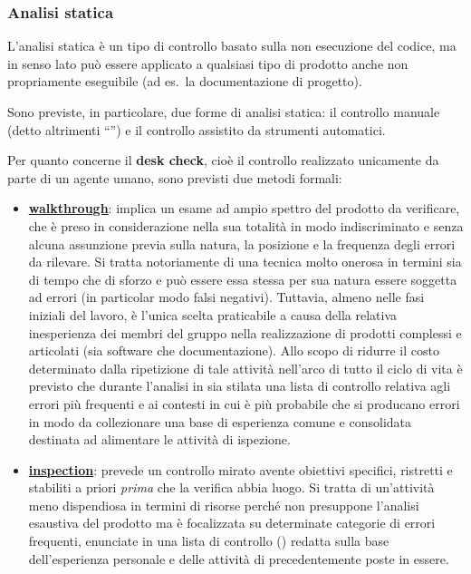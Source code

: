{\subsubsection{Analisi statica}
\label{analisi_statica}
L'analisi statica è un tipo di controllo basato sulla non esecuzione del codice, ma in senso lato può essere applicato a qualsiasi tipo di prodotto anche non propriamente eseguibile (ad es.~la documentazione di progetto).

Sono previste, in particolare, due forme di analisi statica: il controllo manuale (detto altrimenti ``'') e il controllo assistito da strumenti automatici.

Per quanto concerne il \textbf{desk check}, cioè il controllo realizzato unicamente da parte di un agente umano, sono previsti due metodi formali:
\begin{itemize}
  \item \textbf{\underline{walkthrough}}: implica un esame ad ampio spettro del prodotto da verificare, che è preso in considerazione nella sua totalità in modo indiscriminato e senza alcuna assunzione previa sulla natura, la posizione e la frequenza degli errori da rilevare. Si tratta notoriamente di una tecnica molto onerosa in termini sia di tempo che di sforzo e può essere essa stessa per sua natura essere soggetta ad errori (in particolar modo falsi negativi). Tuttavia, almeno nelle fasi iniziali del lavoro, è l'unica scelta praticabile a causa della relativa inesperienza dei membri del gruppo nella realizzazione di prodotti complessi e articolati (sia software che documentazione). Allo scopo di ridurre il costo determinato dalla ripetizione di tale attività nell'arco di tutto il ciclo di vita è previsto che durante l'analisi in sia stilata una lista di controllo relativa agli errori più frequenti e ai contesti in cui è più probabile che si producano errori in modo da collezionare una base di esperienza comune e consolidata destinata ad alimentare le attività di ispezione.
  \item \textbf{\underline{inspection}}: prevede un controllo mirato avente obiettivi specifici, ristretti e stabiliti a priori \emph{prima} che la verifica abbia luogo. Si tratta di un'attività meno dispendiosa in termini di risorse perché non presuppone l'analisi esaustiva del prodotto ma è focalizzata su determinate categorie di errori frequenti, enunciate in una lista di controllo () redatta sulla base dell'esperienza personale e delle attività di  precedentemente poste in essere.
\end{itemize}

}
